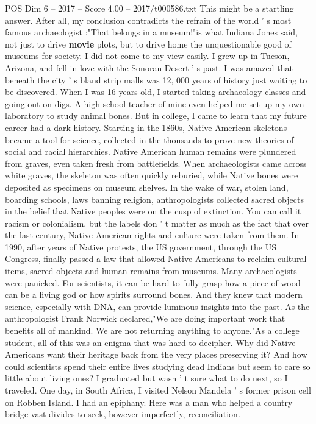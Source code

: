\begin{textsample}{POS Dim 6 – 2017 – Score 4.00 – 2017/t000586.txt}
This might be a startling answer.
After all, my conclusion contradicts the refrain of the world ' s most famous archaeologist :"That belongs in a museum!"is what Indiana Jones said, not just to drive \textbf{movie} plots, but to drive home the unquestionable good of museums for society.
I did not come to my view easily.
I grew up in Tucson, Arizona, and fell in love with the Sonoran Desert ' s past.
I was amazed that beneath the city ' s bland strip malls was 12, 000 years of history just waiting to be discovered.
When I was 16 years old, I started taking archaeology classes and going out on digs.
A high school teacher of mine even helped me set up my own laboratory to study animal bones.
But in college, I came to learn that my future career had a dark history.
Starting in the 1860s, Native American skeletons became a tool for science, collected in the thousands to prove new theories of social and racial hierarchies.
Native American human remains were plundered from graves, even taken fresh from battlefields.
When archaeologists came across white graves, the skeleton was often quickly reburied, while Native bones were deposited as specimens on museum shelves.
In the wake of war, stolen land, boarding schools, laws banning religion, anthropologists collected sacred objects in the belief that Native peoples were on the cusp of extinction.
You can call it racism or colonialism, but the labels don ' t matter as much as the fact that over the last century, Native American rights and culture were taken from them.
In 1990, after years of Native protests, the US government, through the US Congress, finally passed a law that allowed Native Americans to reclaim cultural items, sacred objects and human remains from museums.
Many archaeologists were panicked.
For scientists, it can be hard to fully grasp how a piece of wood can be a living god or how spirits surround bones.
And they knew that modern science, especially with DNA, can provide luminous insights into the past.
As the anthropologist Frank Norwick declared,"We are doing important work that benefits all of mankind.
We are not returning anything to anyone."As a college student, all of this was an enigma that was hard to decipher.
Why did Native Americans want their heritage back from the very places preserving it?
And how could scientists spend their entire lives studying dead Indians but seem to care so little about living ones?
I graduated but wasn ' t sure what to do next, so I traveled.
One day, in South Africa, I visited Nelson Mandela ' s former prison cell on Robben Island.
I had an epiphany.
Here was a man who helped a country bridge vast divides to seek, however imperfectly, reconciliation.

\end{textsample}
